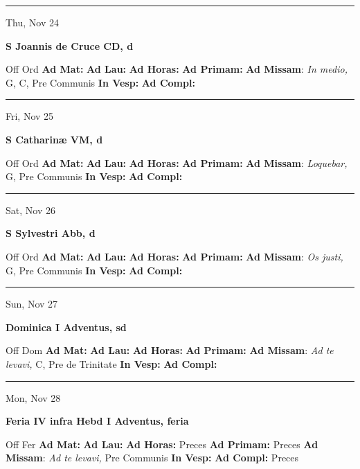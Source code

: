 \documentclass[letterpaper, 10pt]{article}
\begin{document}
\hrule
\begin{center}
Thu, Nov 24
\end{center}\textbf{ \large S Joannis de Cruce CD, \textnormal{\normalsize d}}
\begin{justify}
Off Ord
\textbf{Ad Mat: }
\textbf{Ad Lau: }
\textbf{Ad Horas: }
\textbf{Ad Primam: }
\textbf{Ad Missam}: \textit{In medio,} G, C, Pre Communis
\textbf{In Vesp: }
\textbf{Ad Compl: }\end{justify}



\hrule
\begin{center}
Fri, Nov 25
\end{center}\textbf{ \large S Catharinæ VM, \textnormal{\normalsize d}}
\begin{justify}
Off Ord
\textbf{Ad Mat: }
\textbf{Ad Lau: }
\textbf{Ad Horas: }
\textbf{Ad Primam: }
\textbf{Ad Missam}: \textit{Loquebar,} G, Pre Communis
\textbf{In Vesp: }
\textbf{Ad Compl: }\end{justify}



\hrule
\begin{center}
Sat, Nov 26
\end{center}\textbf{ \large S Sylvestri Abb, \textnormal{\normalsize d}}
\begin{justify}
Off Ord
\textbf{Ad Mat: }
\textbf{Ad Lau: }
\textbf{Ad Horas: }
\textbf{Ad Primam: }
\textbf{Ad Missam}: \textit{Os justi,} G, Pre Communis
\textbf{In Vesp: }
\textbf{Ad Compl: }\end{justify}



\hrule
\begin{center}
Sun, Nov 27
\end{center}\textbf{ \large Dominica I Adventus, \textnormal{\normalsize sd}}
\begin{justify}
Off Dom
\textbf{Ad Mat: }
\textbf{Ad Lau: }
\textbf{Ad Horas: }
\textbf{Ad Primam: }
\textbf{Ad Missam}: \textit{Ad te levavi,} C, Pre de Trinitate
\textbf{In Vesp: }
\textbf{Ad Compl: }\end{justify}



\hrule
\begin{center}
Mon, Nov 28
\end{center}\textbf{ \large Feria IV infra Hebd I Adventus, \textnormal{\normalsize feria}}
\begin{justify}
Off Fer
\textbf{Ad Mat: }
\textbf{Ad Lau: }
\textbf{Ad Horas: }Preces
\textbf{Ad Primam: }Preces
\textbf{Ad Missam}: \textit{Ad te levavi,} Pre Communis
\textbf{In Vesp: }
\textbf{Ad Compl: }Preces\end{justify}
\end{document}
